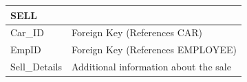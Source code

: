 \begin{table}[h!]
    \centering
    \begin{tabular}{ll}
        \toprule
        \textbf{SELL} & \\
        \midrule
        Car\_ID & Foreign Key (References CAR) \\
        EmpID & Foreign Key (References EMPLOYEE) \\
        Sell\_Details & Additional information about the sale \\
        \bottomrule
    \end{tabular}
\end{table}